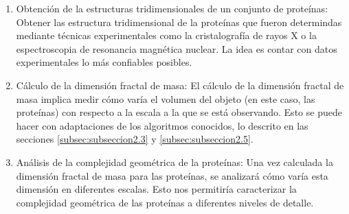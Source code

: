 \documentclass[11pt]{article}
\begin{document}
\begin{enumerate}
	
\item Obtenci\'{o}n de la estructuras tridimensionales de un conjunto de prote\'{i}nas: Obtener las estructura tridimensional de la prote\'{i}nas que fueron determindas mediante t\'{e}cnicas experimentales como la cristalograf\'{i}a de rayos X o la espectroscopia de resonancia magn\'{e}tica nuclear. La idea es contar con datos experimentales lo m\'{a}s confiables posibles.

\item C\'{a}lculo de la dimensi\'{o}n fractal de masa: El c\'{a}lculo de la dimensi\'{o}n fractal de masa implica medir c\'{o}mo var\'{i}a el volumen del objeto (en este caso, las prote\'{i}nas) con respecto a la escala a la que se est\'{a} observando. Esto se puede hacer con adaptaciones de los algoritmos conocidos, lo descrito en las secciones \ref{subsec:subseccion2.3} y \ref{subsec:subseccion2.5}.

\item An\'{a}lisis de la complejidad geom\'{e}trica de la prote\'{i}nas: Una vez calculada la dimensi\'{o}n fractal de masa para las prote\'{i}nas, se analizar\'{a} c\'{o}mo var\'{i}a esta dimensi\'{o}n en diferentes escalas. Esto nos permitir\'{i}a caracterizar la complejidad geom\'{e}trica de las prote\'{i}nas a diferentes niveles de detalle.

\end{enumerate}

\clearpage
\end{document}
